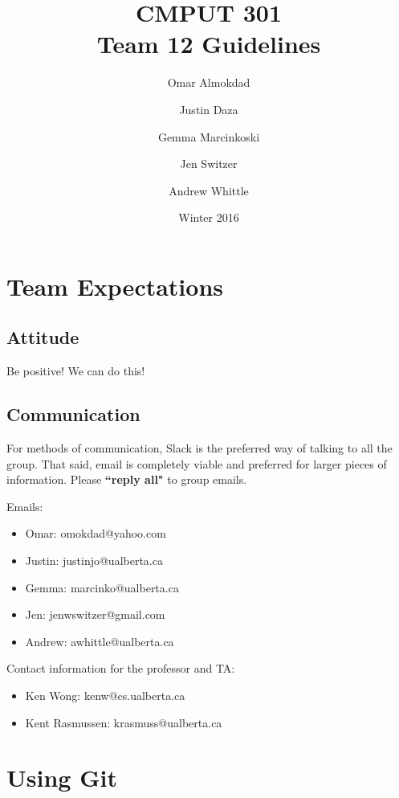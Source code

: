 \documentclass[14pt]{report}
\begin{document}
	\title{CMPUT 301\\Team 12 Guidelines}
	\author{Omar Almokdad \and Justin Daza \and Gemma Marcinkoski \and Jen Switzer \and Andrew Whittle}
	\date{Winter 2016}
	\maketitle
	
	\tableofcontents
	
	\chapter{Team Expectations}
	
	\section{Attitude}
	Be positive! We can do this!
	
	\section{Communication}
	
	For methods of communication, Slack is the preferred way of talking to all the group.
	That said, email is completely viable and preferred for larger pieces of information.
	Please \textbf{``reply all"} to group emails.
	
	Emails:
	
	\begin{itemize}
		\item
		Omar: omokdad@yahoo.com
		\item
		Justin: justinjo@ualberta.ca
		\item
		Gemma: marcinko@ualberta.ca
		\item
		Jen: jenwswitzer@gmail.com
		\item
		Andrew: awhittle@ualberta.ca
	\end{itemize}
	
	Contact information for the professor and TA:

	\begin{itemize}
		\item
		Ken Wong: kenw@cs.ualberta.ca
		\item
		Kent Rasmussen: krasmuss@ualberta.ca
	\end{itemize} 
		
	\chapter{Using Git}
	
\end{document}
